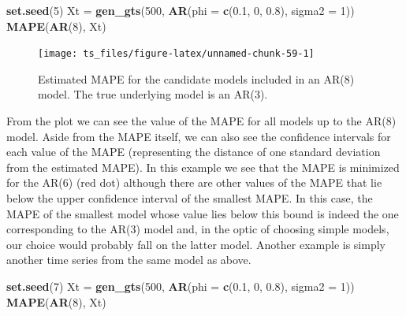 \documentclass[]{book}
\newenvironment{Shaded}{\begin{snugshade}}{\end{snugshade}}
\newcommand{\KeywordTok}[1]{\textcolor[rgb]{0.13,0.29,0.53}{\textbf{#1}}}
\newcommand{\DataTypeTok}[1]{\textcolor[rgb]{0.13,0.29,0.53}{#1}}
\newcommand{\DecValTok}[1]{\textcolor[rgb]{0.00,0.00,0.81}{#1}}
\newcommand{\FloatTok}[1]{\textcolor[rgb]{0.00,0.00,0.81}{#1}}
\newcommand{\StringTok}[1]{\textcolor[rgb]{0.31,0.60,0.02}{#1}}
\newcommand{\NormalTok}[1]{#1}
\theoremstyle{definition}
\theoremstyle{definition}
\theoremstyle{definition}
\theoremstyle{remark}
\begin{document}
\begin{Shaded}
\begin{Highlighting}[]
\KeywordTok{set.seed}\NormalTok{(}\DecValTok{5}\NormalTok{)}
\NormalTok{Xt =}\StringTok{ }\KeywordTok{gen_gts}\NormalTok{(}\DecValTok{500}\NormalTok{, }\KeywordTok{AR}\NormalTok{(}\DataTypeTok{phi =} \KeywordTok{c}\NormalTok{(}\FloatTok{0.1}\NormalTok{, }\DecValTok{0}\NormalTok{, }\FloatTok{0.8}\NormalTok{), }\DataTypeTok{sigma2 =} \DecValTok{1}\NormalTok{))}
\KeywordTok{MAPE}\NormalTok{(}\KeywordTok{AR}\NormalTok{(}\DecValTok{8}\NormalTok{), Xt)}
\end{Highlighting}
\end{Shaded}

\begin{figure}

{\centering \texttt{[image: ts\_files/figure-latex/unnamed-chunk-59-1]} 

}

\caption{Estimated MAPE for the candidate models included in an AR(8) model. The true underlying model is an AR(3).}\label{fig:unnamed-chunk-59}
\end{figure}

From the plot we can see the value of the MAPE for all models up to the
AR(8) model. Aside from the MAPE itself, we can also see the confidence
intervals for each value of the MAPE (representing the distance of one
standard deviation from the estimated MAPE). In this example we see that
the MAPE is minimized for the AR(6) (red dot) although there are other
values of the MAPE that lie below the upper confidence interval of the
smallest MAPE. In this case, the MAPE of the smallest model whose value
lies below this bound is indeed the one corresponding to the AR(3) model
and, in the optic of choosing simple models, our choice would probably
fall on the latter model. Another example is simply another time series
from the same model as above.

\begin{Shaded}
\begin{Highlighting}[]
\KeywordTok{set.seed}\NormalTok{(}\DecValTok{7}\NormalTok{)}
\NormalTok{Xt =}\StringTok{ }\KeywordTok{gen_gts}\NormalTok{(}\DecValTok{500}\NormalTok{, }\KeywordTok{AR}\NormalTok{(}\DataTypeTok{phi =} \KeywordTok{c}\NormalTok{(}\FloatTok{0.1}\NormalTok{, }\DecValTok{0}\NormalTok{, }\FloatTok{0.8}\NormalTok{), }\DataTypeTok{sigma2 =} \DecValTok{1}\NormalTok{))}
\KeywordTok{MAPE}\NormalTok{(}\KeywordTok{AR}\NormalTok{(}\DecValTok{8}\NormalTok{), Xt)}
\end{Highlighting}
\end{Shaded}
\end{document}
